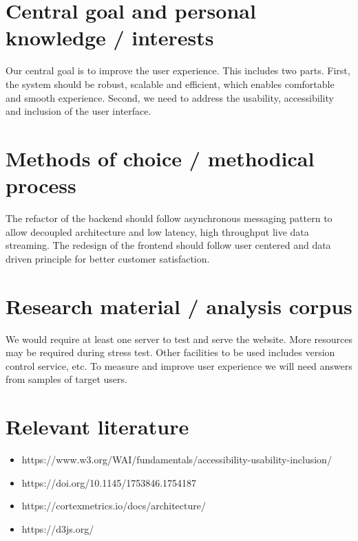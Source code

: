 \documentclass[12pt]{scrartcl}
\begin{document}
\section*{Central goal and personal knowledge / interests} %

Our central goal is to improve the user experience. This includes two parts. First, the system should be robust, scalable and efficient, which enables comfortable and smooth experience. Second, we need to address the usability, accessibility and inclusion of the user interface.

\section*{Methods of choice / methodical process} %


The refactor of the backend should follow asynchronous messaging pattern to allow decoupled architecture and low latency, high throughput live data streaming. The redesign of the frontend should follow user centered and data driven principle for better customer satisfaction.

\section*{Research material / analysis corpus} %

We would require at least one server to test and serve the website. More resources may be required during stress test. Other facilities to be used includes version control service, etc. To measure and improve user experience we will need answers from samples of target users.

\section*{Relevant literature} %

\begin{itemize}
    \item https://www.w3.org/WAI/fundamentals/accessibility-usability-inclusion/
    \item https://doi.org/10.1145/1753846.1754187
    \item https://cortexmetrics.io/docs/architecture/ %
    \item https://d3js.org/ %
\end{itemize}
\end{document}
